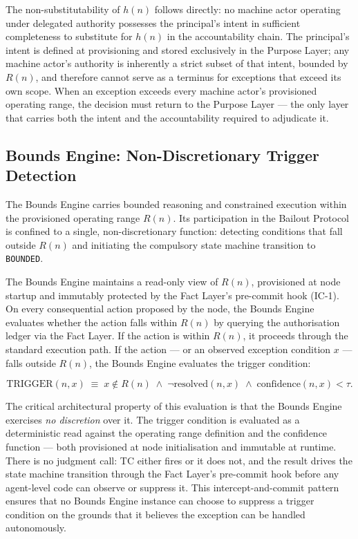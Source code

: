 The non-substitutability of $h(n)$ follows directly: no machine actor operating under delegated authority possesses the principal's intent in sufficient completeness to substitute for $h(n)$ in the accountability chain. The principal's intent is defined at provisioning and stored exclusively in the Purpose Layer; any machine actor's authority is inherently a strict subset of that intent, bounded by $R(n)$, and therefore cannot serve as a terminus for exceptions that exceed its own scope. When an exception exceeds every machine actor's provisioned operating range, the decision must return to the Purpose Layer — the only layer that carries both the intent and the accountability required to adjudicate it.

\subsection{Bounds Engine: Non-Discretionary Trigger Detection}
\label{sec:bounds-engine}

The Bounds Engine carries bounded reasoning and constrained execution within the provisioned operating range $R(n)$. Its participation in the Bailout Protocol is confined to a single, non-discretionary function: detecting conditions that fall outside $R(n)$ and initiating the compulsory state machine transition to \texttt{BOUNDED}.

The Bounds Engine maintains a read-only view of $R(n)$, provisioned at node startup and immutably protected by the Fact Layer's pre-commit hook (IC-1). On every consequential action proposed by the node, the Bounds Engine evaluates whether the action falls within $R(n)$ by querying the authorisation ledger via the Fact Layer. If the action is within $R(n)$, it proceeds through the standard execution path. If the action — or an observed exception condition $x$ — falls outside $R(n)$, the Bounds Engine evaluates the trigger condition:

\begin{equation}
\text{TRIGGER}(n, x) \;\equiv\; x \notin R(n) \;\land\; \neg\text{resolved}(n, x) \;\land\; \text{confidence}(n, x) < \tau .
\tag{TC}
\end{equation}

The critical architectural property of this evaluation is that the Bounds Engine exercises \emph{no discretion} over it. The trigger condition is evaluated as a deterministic read against the operating range definition and the confidence function — both provisioned at node initialisation and immutable at runtime. There is no judgment call: TC either fires or it does not, and the result drives the state machine transition through the Fact Layer's pre-commit hook before any agent-level code can observe or suppress it. This intercept-and-commit pattern ensures that no Bounds Engine instance can choose to suppress a trigger condition on the grounds that it believes the exception can be handled autonomously.

